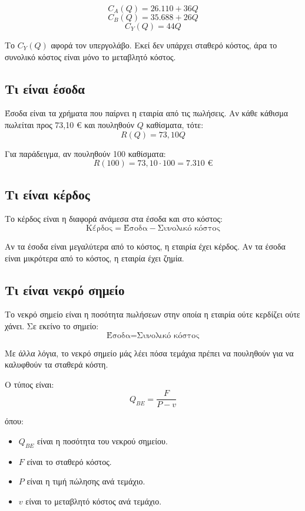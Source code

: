 \documentclass[12pt,a4paper]{article}
\begin{document}
\[
C_A(Q)=26.110+36Q
\]
\[
C_B(Q)=35.688+26Q
\]
\[
C_Y(Q)=44Q
\]

Το \(C_Y(Q)\) αφορά τον υπεργολάβο. Εκεί δεν υπάρχει σταθερό κόστος, άρα το συνολικό κόστος είναι μόνο το μεταβλητό κόστος.

\subsection{Τι είναι έσοδα}

Έσοδα είναι τα χρήματα που παίρνει η εταιρία από τις πωλήσεις. Αν κάθε κάθισμα πωλείται προς 73,10 € και πουληθούν \(Q\) καθίσματα, τότε:
\[
R(Q)=73{,}10Q
\]

Για παράδειγμα, αν πουληθούν 100 καθίσματα:
\[
R(100)=73{,}10\cdot100=7.310 \text{ €}
\]

\subsection{Τι είναι κέρδος}

Το κέρδος είναι η διαφορά ανάμεσα στα έσοδα και στο κόστος:
\[
\text{Κέρδος} = \text{Έσοδα} - \text{Συνολικό κόστος}
\]

Αν τα έσοδα είναι μεγαλύτερα από το κόστος, η εταιρία έχει κέρδος. Αν τα έσοδα είναι μικρότερα από το κόστος, η εταιρία έχει ζημία.

\subsection{Τι είναι νεκρό σημείο}

Το νεκρό σημείο είναι η ποσότητα πωλήσεων στην οποία η εταιρία ούτε κερδίζει ούτε χάνει. Σε εκείνο το σημείο:
\[
\text{Έσοδα} = \text{Συνολικό κόστος}
\]

Με άλλα λόγια, το νεκρό σημείο μάς λέει πόσα τεμάχια πρέπει να πουληθούν για να καλυφθούν τα σταθερά κόστη.

Ο τύπος είναι:
\[
Q_{BE}=\frac{F}{P-v}
\]

όπου:

\begin{itemize}
    \item \(Q_{BE}\) είναι η ποσότητα του νεκρού σημείου.
    \item \(F\) είναι το σταθερό κόστος.
    \item \(P\) είναι η τιμή πώλησης ανά τεμάχιο.
    \item \(v\) είναι το μεταβλητό κόστος ανά τεμάχιο.
\end{itemize}
\end{document}
